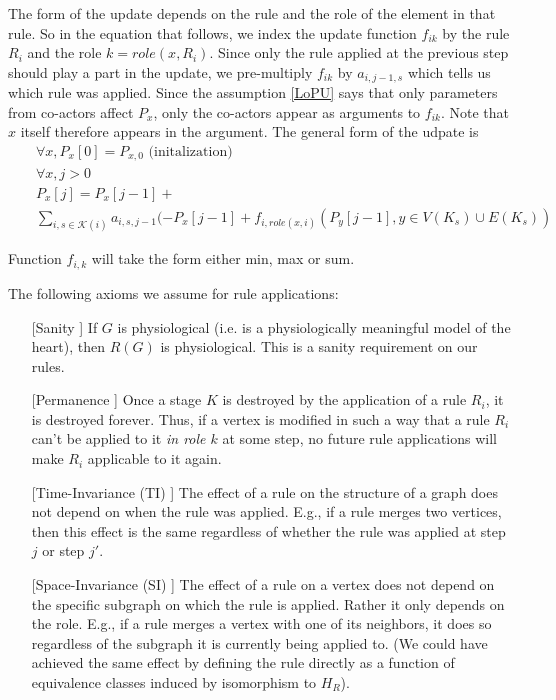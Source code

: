 \documentclass[11pt, oneside, reqno]{article}
\newcommand{\Kc}{\mathcal{K}}
\begin{document}
The form of the update depends on the rule and the role of the element in that rule.
So in the equation that follows, we index the update function $f_{ik}$ by the rule $R_i$ and the role $k=role(x,R_i)$.
Since only the rule applied at the previous step should play a part in the update, we pre-multiply $f_{ik}$ by $a_{i,j-1,s}$ which tells us which rule was applied.
Since the assumption \ref{LoPU} says that only parameters from co-actors affect $P_x$, only the co-actors appear as arguments to $f_{ik}$.
Note that $x$ itself therefore appears in the argument.
The general form of the udpate is
\begin{eqnarray}
\label{eq:paramUpdate}
&&\forall x, P_x[0] = P_{x,0} \textrm{ (initalization)}
\\
&& \forall x, j>0
\nonumber
\\
&& P_x[j] = P_x[j-1] + 
\nonumber
\\
&& \sum_{i,s \in \Kc(i)}a_{i,s,j-1} (-P_x[j-1] +  f_{i,role(x,i)}(P_y[j-1],y \in V(K_s)\cup E(K_s))
\nonumber
\end{eqnarray}

Function $f_{i,k}$ will take the form either min, max or sum.

The following axioms we assume for rule applications:
\begin{enumerate}
	\item [[Sanity]] If $G$ is physiological (i.e. is a physiologically meaningful model of the heart), then $R(G)$ is physiological. This is a sanity requirement on our rules.
	\label{axiomSanity}
	\item [[Permanence]] Once a stage $K$ is destroyed by the application of a rule $R_i$, it is destroyed forever.
	Thus, if a vertex is modified in such a way that a rule $R_i$ can't be applied to it \emph{in role $k$} at some step, no future rule applications will make $R_i$ applicable to it again.
	\label{axiomPermanence}
	\item [[Time-Invariance (TI)]] The effect of a rule on the structure of a graph does not depend on when the rule was applied.
	E.g., if a rule merges two vertices, then this effect is the same regardless of whether the rule was applied at step $j$ or step $j'$.
	\label{axiomTI}
	\item [[Space-Invariance (SI)]] The effect of a rule on a vertex does not depend on the specific subgraph on which the rule is applied. 
	Rather it only depends on the role.
	E.g., if a rule merges a vertex with one of its neighbors, it does so regardless of the subgraph it is currently being applied to. 
	(We could have achieved the same effect by defining the rule directly as a function of equivalence classes induced by isomorphism to $H_R$).
	\label{axiomSI}
\end{enumerate}
\end{document}
